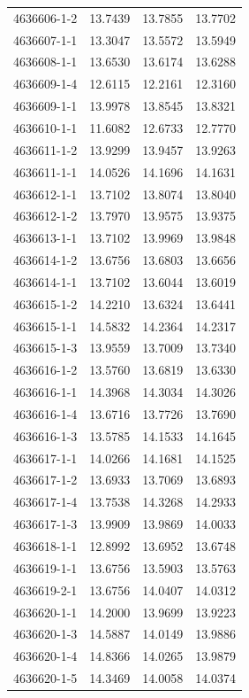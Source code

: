 \begin{longtable}{lrrr}
4636606-1-2 & 13.7439 & 13.7855 & 13.7702 \\
4636607-1-1 & 13.3047 & 13.5572 & 13.5949 \\
4636608-1-1 & 13.6530 & 13.6174 & 13.6288 \\
4636609-1-4 & 12.6115 & 12.2161 & 12.3160 \\
4636609-1-1 & 13.9978 & 13.8545 & 13.8321 \\
4636610-1-1 & 11.6082 & 12.6733 & 12.7770 \\
4636611-1-2 & 13.9299 & 13.9457 & 13.9263 \\
4636611-1-1 & 14.0526 & 14.1696 & 14.1631 \\
4636612-1-1 & 13.7102 & 13.8074 & 13.8040 \\
4636612-1-2 & 13.7970 & 13.9575 & 13.9375 \\
4636613-1-1 & 13.7102 & 13.9969 & 13.9848 \\
4636614-1-2 & 13.6756 & 13.6803 & 13.6656 \\
4636614-1-1 & 13.7102 & 13.6044 & 13.6019 \\
4636615-1-2 & 14.2210 & 13.6324 & 13.6441 \\
4636615-1-1 & 14.5832 & 14.2364 & 14.2317 \\
4636615-1-3 & 13.9559 & 13.7009 & 13.7340 \\
4636616-1-2 & 13.5760 & 13.6819 & 13.6330 \\
4636616-1-1 & 14.3968 & 14.3034 & 14.3026 \\
4636616-1-4 & 13.6716 & 13.7726 & 13.7690 \\
4636616-1-3 & 13.5785 & 14.1533 & 14.1645 \\
4636617-1-1 & 14.0266 & 14.1681 & 14.1525 \\
4636617-1-2 & 13.6933 & 13.7069 & 13.6893 \\
4636617-1-4 & 13.7538 & 14.3268 & 14.2933 \\
4636617-1-3 & 13.9909 & 13.9869 & 14.0033 \\
4636618-1-1 & 12.8992 & 13.6952 & 13.6748 \\
4636619-1-1 & 13.6756 & 13.5903 & 13.5763 \\
4636619-2-1 & 13.6756 & 14.0407 & 14.0312 \\
4636620-1-1 & 14.2000 & 13.9699 & 13.9223 \\
4636620-1-3 & 14.5887 & 14.0149 & 13.9886 \\
4636620-1-4 & 14.8366 & 14.0265 & 13.9879 \\
4636620-1-5 & 14.3469 & 14.0058 & 14.0374 \\

\end{longtable}
